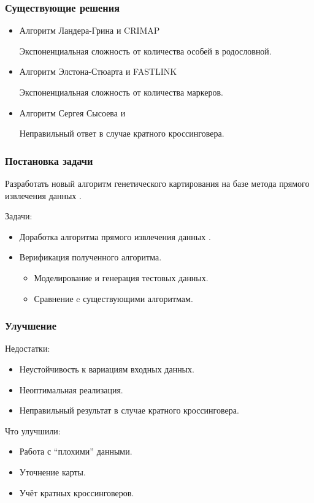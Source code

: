 \documentclass{beamer}
\begin{document}
\begin{frame}
  \frametitle{Существующие решения}
  \begin{itemize}
  \item Алгоритм Ландера-Грина и CRIMAP

    Экспоненциальная сложность от количества особей в родословной.
  \item Алгоритм Элстона-Стюарта и FASTLINK

    Экспоненциальная сложность от количества маркеров.
  \item Алгоритм Сергея Сысоева и \genmap

    Неправильный ответ в случае кратного кроссинговера.
  \end{itemize}
\end{frame}

\begin{frame}
  \frametitle{Постановка задачи}
  Разработать новый алгоритм генетического картирования на базе метода
  прямого извлечения данных \genmap.

  \medskip

  Задачи:
  \begin{itemize}
  \item Доработка алгоритма прямого извлечения данных \genmap.
  \item Верификация полученного алгоритма.
    \begin{itemize}
    \item Моделирование и генерация тестовых данных.
    \item Сравнение c существующими алгоритмам.
    \end{itemize}
  \end{itemize}
\end{frame}

\begin{frame}
  \frametitle{Улучшение \genmap}

  Недостатки:
  \begin{itemize}
  \item Неустойчивость к вариациям входных данных.
  \item Неоптимальная реализация.
  \item Неправильный результат в случае кратного кроссинговера.
  \end{itemize}

  Что улучшили:
  \begin{itemize}
  \item Работа с ``плохими'' данными.
  \item Уточнение карты.
  \item Учёт кратных кроссинговеров.
  \end{itemize}
\end{frame}
\end{document}
